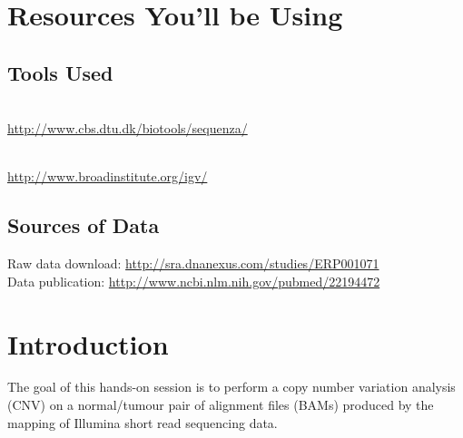 
\section{Resources You'll be Using}

\subsection{Tools Used}

\begin{description}[style=multiline,labelindent=0cm,align=left,leftmargin=1cm]
  \item[Sequenza] \hfill\\
    \url{http://www.cbs.dtu.dk/biotools/sequenza/}
  \item[IGV] \hfill\\
    \url{http://www.broadinstitute.org/igv/}
\end{description}


\subsection{Sources of Data}

Raw data download: \url{http://sra.dnanexus.com/studies/ERP001071}\\
Data publication: \url{http://www.ncbi.nlm.nih.gov/pubmed/22194472}


\newpage


\section{Introduction}

The goal of this hands-on session is to perform a copy number variation analysis (CNV) on a normal/tumour pair of alignment files (BAMs) produced by the mapping of Illumina short read sequencing data. 

